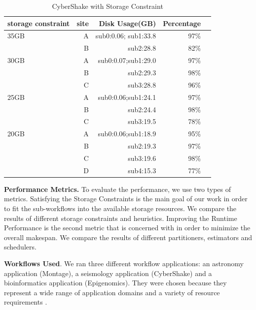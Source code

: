 \begin{table}[h!]
\caption{CyberShake with Storage Constraint}
\label{tab:constraint}
\centering
\begin{tabular}{lrrrr}
\hline
 storage constraint    &    site &    Disk Usage(GB) &   Percentage  \\
\hline
35GB & A & sub0:0.06; sub1:33.8 & 97\%&\\
& B & sub2:28.8&82\% &\\
30GB & A & sub0:0.07;sub1:29.0 & 97\% \\
& B & sub2:29.3&98\% &\\
& C & sub3:28.8&96\% &\\
25GB & A & sub0:0.06;sub1:24.1 & 97\%& \\

 & B & sub2:24.4 & 98\%& \\
&C&sub3:19.5&78\%&\\
20GB&A&sub0:0.06;sub1:18.9&95\%&\\
&B&sub2:19.3&97\%&\\
&C&sub3:19.6&98\%&\\
&D&sub4:15.3&77\%&\\
\hline
\end{tabular}
\end{table} 


\textbf{Performance Metrics.} To evaluate the performance, we use two types of metrics. Satisfying the Storage Constraints is the main goal of our work in order to fit the sub-workflows into the available storage resources. We compare the results of different storage constraints and heuristics. Improving the Runtime Performance is the second metric that is concerned with in order to minimize the overall makespan. We compare the results of different partitioners, estimators and schedulers. 

\textbf{Workflows Used}. We ran three different workflow applications: an astronomy application (Montage), a seismology application (CyberShake) and a bioinformatics application (Epigenomics). They were chosen because they represent a wide range of application domains and a variety of resource requirements \cite{Juve2009}. 


